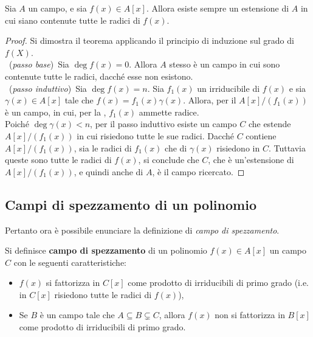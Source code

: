 \begin{theorem}
    \label{th:esistenza_spezzamento}
    Sia $A$ un campo, e sia $f(x) \in A[x]$.
    Allora esiste sempre un estensione di $A$ in cui siano
    contenute tutte le radici di $f(x)$.
\end{theorem}

\begin{proof}
    Si dimostra il teorema applicando il principio di induzione sul
    grado di $f(X)$. \\

    \ (\textit{passo base}) \,Sia $\deg f(x) = 0$. Allora $A$ stesso è un
    campo in cui sono contenute tutte le radici, dacché esse non esistono. \\

    \ (\textit{passo induttivo}) \,Sia $\deg f(x) = n$. Sia $f_1(x)$ un
    irriducibile di $f(x)$ e sia $\gamma(x) \in A[x]$ tale che
    $f(x)=f_1(x)\gamma(x)$. Allora, per il 
    $A[x]/(f_1(x))$ è un campo, in cui, per la ,
    $f_1(x)$ ammette radice. \\

    Poiché $\deg \gamma(x) < n$, per il passo induttivo
    esiste un campo $C$ che estende $A[x]/(f_1(x))$ in cui risiedono tutte le sue radici. Dacché $C$ contiene $A[x]/(f_1(x))$, sia le radici
    di $f_1(x)$ che di $\gamma(x)$ risiedono in $C$. Tuttavia queste sono
    tutte le radici di $f(x)$, si conclude che $C$, che è un'estensione di $A[x]/(f_1(x))$, e quindi anche di $A$, è il campo ricercato.
\end{proof}

\subsection{Campi di spezzamento di un polinomio}

Pertanto ora è possibile enunciare la definizione di \textit{campo di spezzamento}.

\begin{definition}
    Si definisce \textbf{campo di spezzamento} di un polinomio $f(x) \in A[x]$ un
    campo $C$ con le seguenti caratteristiche:

    \begin{itemize}
        \item $f(x)$ si fattorizza in $C[x]$ come prodotto di irriducibili di
              primo grado (i.e. in $C[x]$ risiedono tutte le radici di $f(x)$),
        \item Se $B$ è un campo tale che $A \subseteq B \subsetneq C$, allora
              $f(x)$ non si fattorizza in $B[x]$ come prodotto di irriducibili di
              primo grado.
    \end{itemize}
\end{definition}

